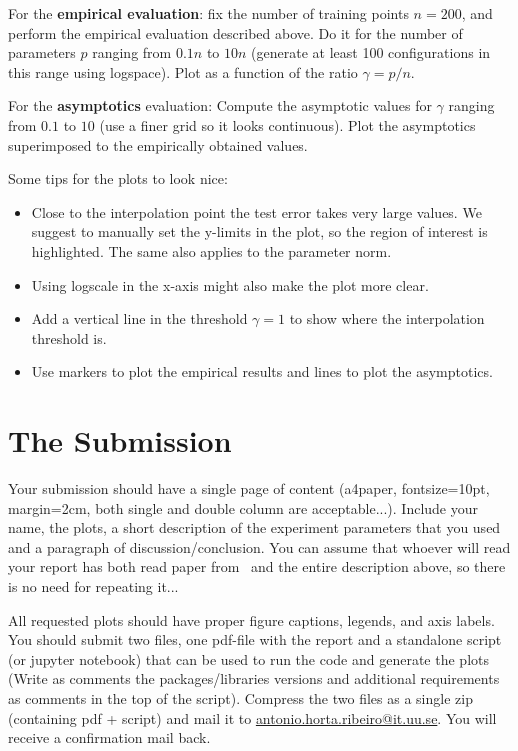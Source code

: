 \documentclass[a4paper,10pt]{article}
\newenvironment{note}
{
\begin{center}
\begin{lrbox}{\mybox}
\begin{minipage}{42em}}
{\end{minipage}
\end{lrbox}\fbox{\usebox{\mybox}}
\end{center}}
\begin{document}
For the \textbf{empirical evaluation}: fix the number of training points $n = 200$, and perform the empirical evaluation described above. Do it for the number of parameters $p$ ranging from $0.1n$ to $10 n$ (generate at least 100 configurations in this range using logspace). Plot as a function of the ratio $\gamma = p / n$.

For the \textbf{asymptotics} evaluation: Compute the asymptotic values for $\gamma$ ranging from $0.1$ to $10$ (use a finer grid so it looks continuous). Plot the asymptotics superimposed to the empirically obtained values.

   \begin{note}
    Some tips for the plots to look nice:
    \begin{itemize}
        \item Close to the interpolation point the test error takes very
        large values. We suggest to manually set the y-limits in the plot, so the region of interest is highlighted. The same also applies to the parameter norm.
        \item Using logscale in the x-axis might also make the plot more clear.
        \item Add a vertical line in the threshold $\gamma = 1$ to show where the interpolation threshold is.
        \item Use markers to plot the empirical results and lines to plot the asymptotics.
    \end{itemize}
    \end{note}

\section*{The Submission}
Your submission should have a single page of content (a4paper, fontsize=10pt, margin=2cm, both single and double column are acceptable...).  Include your name, the plots, a short description of the experiment parameters that you used and a paragraph of discussion/conclusion. You can assume that whoever will read your report has both read paper from~\citep{hastie_surprises_2019} and the entire description above, so there is no need for repeating it... 

All requested plots should have proper figure captions, legends, and axis labels. You should submit two files, one pdf-file with the report and a standalone script (or jupyter notebook) that can be used to run the code and generate the plots (Write as comments the packages/libraries versions and additional requirements as comments in the top of the script). Compress the two files as a single zip (containing pdf + script) and mail it to \href{mailto:antonio.horta.ribeiro@it.uu.se}{antonio.horta.ribeiro@it.uu.se}. You will receive a confirmation mail back.
\end{document}
